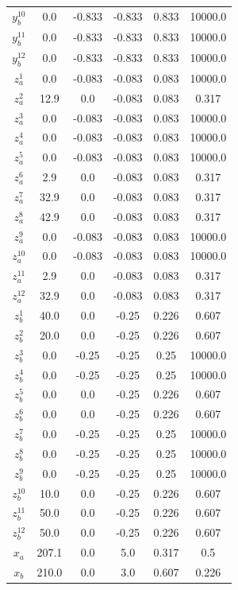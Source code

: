 \documentclass[a4paper,11pt]{article}
\begin{document}
\begin{longtable}{cccccc}
$y_b^{10}$ & 0.0 & -0.833 & -0.833 & 0.833 & 10000.0\\
$y_b^{11}$ & 0.0 & -0.833 & -0.833 & 0.833 & 10000.0\\
$y_b^{12}$ & 0.0 & -0.833 & -0.833 & 0.833 & 10000.0\\
$z_a^{1}$ & 0.0 & -0.083 & -0.083 & 0.083 & 10000.0\\
\addlinespace
$z_a^{2}$ & 12.9 & 0.0 & -0.083 & 0.083 & 0.317\\
$z_a^{3}$ & 0.0 & -0.083 & -0.083 & 0.083 & 10000.0\\
$z_a^{4}$ & 0.0 & -0.083 & -0.083 & 0.083 & 10000.0\\
$z_a^{5}$ & 0.0 & -0.083 & -0.083 & 0.083 & 10000.0\\
$z_a^{6}$ & 2.9 & 0.0 & -0.083 & 0.083 & 0.317\\
\addlinespace
$z_a^{7}$ & 32.9 & 0.0 & -0.083 & 0.083 & 0.317\\
$z_a^{8}$ & 42.9 & 0.0 & -0.083 & 0.083 & 0.317\\
$z_a^{9}$ & 0.0 & -0.083 & -0.083 & 0.083 & 10000.0\\
$z_a^{10}$ & 0.0 & -0.083 & -0.083 & 0.083 & 10000.0\\
$z_a^{11}$ & 2.9 & 0.0 & -0.083 & 0.083 & 0.317\\
\addlinespace
$z_a^{12}$ & 32.9 & 0.0 & -0.083 & 0.083 & 0.317\\
$z_b^{1}$ & 40.0 & 0.0 & -0.25 & 0.226 & 0.607\\
$z_b^{2}$ & 20.0 & 0.0 & -0.25 & 0.226 & 0.607\\
$z_b^{3}$ & 0.0 & -0.25 & -0.25 & 0.25 & 10000.0\\
$z_b^{4}$ & 0.0 & -0.25 & -0.25 & 0.25 & 10000.0\\
\addlinespace
$z_b^{5}$ & 0.0 & 0.0 & -0.25 & 0.226 & 0.607\\
$z_b^{6}$ & 0.0 & 0.0 & -0.25 & 0.226 & 0.607\\
$z_b^{7}$ & 0.0 & -0.25 & -0.25 & 0.25 & 10000.0\\
$z_b^{8}$ & 0.0 & -0.25 & -0.25 & 0.25 & 10000.0\\
$z_b^{9}$ & 0.0 & -0.25 & -0.25 & 0.25 & 10000.0\\
\addlinespace
$z_b^{10}$ & 10.0 & 0.0 & -0.25 & 0.226 & 0.607\\
$z_b^{11}$ & 50.0 & 0.0 & -0.25 & 0.226 & 0.607\\
$z_b^{12}$ & 50.0 & 0.0 & -0.25 & 0.226 & 0.607\\
$x_a$ & 207.1 & 0.0 & 5.0 & 0.317 & 0.5\\
$x_b$ & 210.0 & 0.0 & 3.0 & 0.607 & 0.226\\*
\end{longtable}
\endgroup{}
\end{document}
